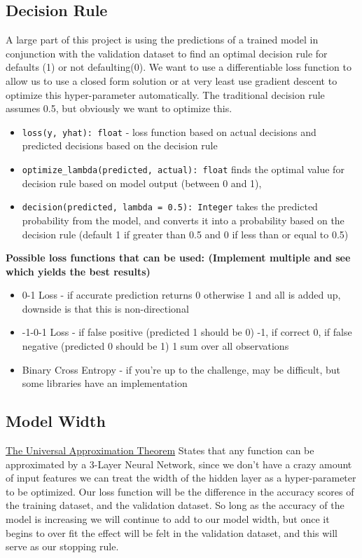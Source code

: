 \documentclass{article}
\begin{document}
	\subsection{Decision Rule}
	
	A large part of this project is using the predictions of a trained model in conjunction with the validation dataset to 
	find an optimal decision rule for defaults (1) or not defaulting(0). We want to use a differentiable loss function to 
	allow us to use a closed form solution or at very least use gradient descent to optimize this hyper-parameter automatically. 
	The traditional decision rule assumes 0.5, but obviously we want to optimize this. 
	
	\begin{itemize}
		\item \verb|loss(y, yhat): float| - loss function based on actual decisions and predicted decisions based on the decision rule
		\item \verb|optimize_lambda(predicted, actual): float| finds the optimal value for decision rule based on model output (between 0 and 1), 
		\item \verb|decision(predicted, lambda = 0.5): Integer| takes the predicted probability from the model, and converts it into a probability 
		based on the decision rule (default 1 if greater than 0.5 and 0 if less than or equal to 0.5) 
	\end{itemize}
	
	\textbf{Possible loss functions that can be used: (Implement multiple and see which yields the best results)}
	\begin{itemize}
		\item 0-1 Loss - if accurate prediction returns 0 otherwise 1 and all is added up, downside is that this is non-directional
		\item -1-0-1 Loss - if false positive (predicted 1 should be 0)  -1, if correct 0, if false negative (predicted 0 should be 1) 1 sum over all 
		observations 
		\item Binary Cross Entropy - if you're up to the challenge, may be difficult, but some libraries have an implementation 
	\end{itemize}
	
	\subsection{Model Width} 
	
	\href{http://neuralnetworksanddeeplearning.com/chap4.html}{The Universal Approximation Theorem} States that any function can be approximated by 
	a 3-Layer Neural Network, since we don't have a crazy amount of input features we can treat the width of the hidden layer as a hyper-parameter 
	to be optimized. Our loss function will be the difference in the accuracy scores of the training dataset, and the validation dataset. So long as 
	the accuracy of the model is increasing we will continue to add to our model width, but once it begins to over fit the effect will be felt 
	in the validation dataset, and this will serve as our stopping rule. 
	
\end{document}
